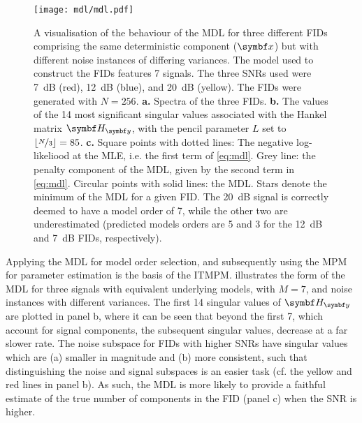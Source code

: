 \begin{figure}
    \centering
    \texttt{[image: mdl/mdl.pdf]}
    \caption[
        A visualisation of the behaviour of the \acs{MDL} for three different
        \acsp{FID} comprising the same deterministic component, but with
        different noise variances.
    ]{
        A visualisation of the behaviour of the \acs{MDL} for three different
        \acsp{FID} comprising the same deterministic component ($\bx$) but
        with different noise instances of differing variances. The model used
        to construct the \acp{FID} features 7
        signals. The three \acsp{SNR} used were
        \qty{7}{\deci\bel} (red), \qty{12}{\deci\bel} (blue), and
        \qty{20}{\deci\bel} (yellow). The \acsp{FID} were generated with $N
        = 256$.
        \textbf{a.} Spectra of the three \acsp{FID}.
        \textbf{b.} The values of the 14 most significant singular values
        associated with the Hankel matrix $\Hy$, with the
        pencil parameter $L$ set to $\lfloor \nicefrac{N}{3} \rfloor =
        85$.
        \textbf{c.} Square points with dotted lines: The negative log-likeliood
        at the \ac{MLE}, i.e. the first term of \cref{eq:mdl}.
        Grey line: the penalty component of the \ac{MDL}, given by the second
        term in \cref{eq:mdl}.
        Circular points with solid lines: the \ac{MDL}.
        Stars denote the minimum of the \ac{MDL} for a given \ac{FID}. The
        \qty{20}{\deci\bel}
        signal is correctly deemed to have a model order of 7, while the other
        two are underestimated (predicted models orders are 5 and 3 for the
        \qty{12}{\deci\bel} and \qty{7}{\deci\bel} \acsp{FID}, respectively).
    }
    \label{fig:mdl}
\end{figure}
Applying the \ac{MDL} for model order selection, and subsequently using the
\ac{MPM} for parameter estimation is the basis of the \ac{ITMPM}\cite{Lin1997}.
 illustrates the form of the \ac{MDL} for three signals
with equivalent underlying models, with $M=7$, and noise instances with
different variances. The first 14 singular values of $\Hy$
are plotted in panel b, where it can be seen that beyond the first 7,
which account for signal components, the subsequent singular values, decrease
at a far slower rate. The noise subspace for \acp{FID} with higher \acp{SNR}
have singular values which are (a) smaller in magnitude and (b) more
consistent, such that distinguishing the noise and signal subspaces is an
easier task (cf. the yellow and red lines in panel b). As such, the
\ac{MDL} is more likely to provide a faithful estimate of the true number of
components in the \ac{FID} (panel c) when the \ac{SNR} is higher.

